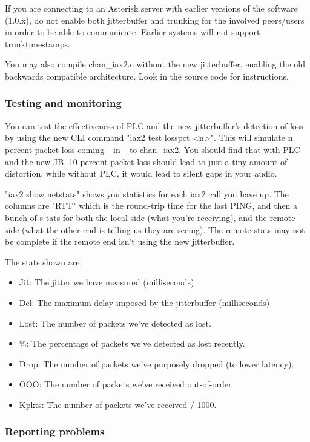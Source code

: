If you are connecting to an Asterisk server with earlier versions of the software (1.0.x),
do not enable both jitterbuffer and trunking for the involved peers/users 
in order to be able  to communicate. Earlier systems will not support trunktimestamps.

You may also compile chan\_iax2.c without the new jitterbuffer, enabling the old 
backwards compatible architecture. Look in the source code for instructions.


\subsubsection{Testing and monitoring}

You can test the effectiveness of PLC and the new jitterbuffer's detection of loss by using 
the new CLI command "iax2 test losspct <n>".  This will simulate n percent packet loss 
coming \_in\_ to chan\_iax2. You should find that with PLC and the new JB, 10 percent packet 
loss should lead to just a tiny amount of distortion, while without PLC, it would lead to 
silent gaps in your audio.

"iax2 show netstats" shows you statistics for each iax2 call you have up.  
The columns are "RTT" which is the round-trip time for the last PING, and then a bunch of s
tats for both the local side (what you're receiving), and the remote side (what the other 
end is telling us they are seeing).  The remote stats may not be complete if the remote 
end isn't using the new jitterbuffer.

The stats shown are:
\begin{itemize}
\item Jit: The jitter we have measured (milliseconds)
\item Del: The maximum delay imposed by the jitterbuffer (milliseconds)
\item Lost: The number of packets we've detected as lost.
\item \%: The percentage of packets we've detected as lost recently.
\item Drop: The number of packets we've purposely dropped (to lower latency).
\item OOO: The number of packets we've received out-of-order
\item Kpkts: The number of packets we've received / 1000.
\end{itemize}

\subsubsection{Reporting problems} 

